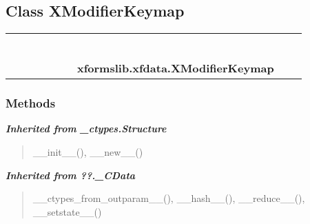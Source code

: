 
\subsection{Class XModifierKeymap}

    \label{xformslib:xfdata:XModifierKeymap}
\begin{tabular}{cccccccccc}
\multicolumn{2}{r}{\settowidth{\BCL}{object}\multirow{2}{\BCL}{object}}
&&
&&
&&
  \\\cline{3-3}
  &&\multicolumn{1}{c|}{}
&&
&&
&&
  \\
\multicolumn{4}{r}{\settowidth{\BCL}{??.\_CData}\multirow{2}{\BCL}{??.\_CData}}
&&
&&
  \\\cline{5-5}
  &&&&\multicolumn{1}{c|}{}
&&
&&
  \\
\multicolumn{6}{r}{\settowidth{\BCL}{\_ctypes.Structure}\multirow{2}{\BCL}{\_ctypes.Structure}}
&&
  \\\cline{7-7}
  &&&&&&\multicolumn{1}{c|}{}
&&
  \\
&&&&&&\multicolumn{2}{l}{\textbf{xformslib.xfdata.XModifierKeymap}}
\end{tabular}



  \subsubsection{Methods}


\large{\textbf{\textit{Inherited from \_ctypes.Structure}}}

\begin{quote}
\_\_init\_\_(), \_\_new\_\_()
\end{quote}

\large{\textbf{\textit{Inherited from ??.\_CData}}}

\begin{quote}
\_\_ctypes\_from\_outparam\_\_(), \_\_hash\_\_(), \_\_reduce\_\_(), \_\_setstate\_\_()
\end{quote}

